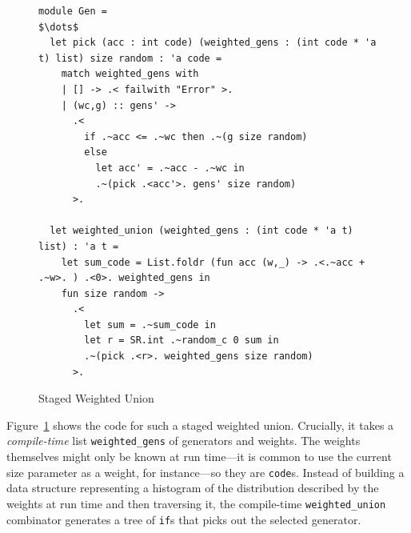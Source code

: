 \documentclass[acmsmall]{acmart}
\theoremstyle{definition}
\begin{document}

\begin{figure}[h]
\begin{lstlisting}
module Gen =
$\dots$
  let pick (acc : int code) (weighted_gens : (int code * 'a t) list) size random : 'a code =
    match weighted_gens with
    | [] -> .< failwith "Error" >.
    | (wc,g) :: gens' ->
      .<
        if .~acc <= .~wc then .~(g size random)
        else
          let acc' = .~acc - .~wc in
          .~(pick .<acc'>. gens' size random)
      >.

  let weighted_union (weighted_gens : (int code * 'a t) list) : 'a t =
    let sum_code = List.foldr (fun acc (w,_) -> .<.~acc + .~w>. ) .<0>. weighted_gens in
    fun size random ->
      .<
        let sum = .~sum_code in
        let r = SR.int .~random_c 0 sum in
        .~(pick .<r>. weighted_gens size random)
      >.
\end{lstlisting}
\caption{Staged Weighted Union}
\label{fig:staged-weighted-union}
\end{figure}

Figure~\ref{fig:staged-weighted-union} shows the code for such a staged weighted union.
Crucially, it takes a \emph{compile-time} list \texttt{weighted\_gens} of
generators and weights. The weights themselves might only be known at run time---it is
common to use the current size parameter as a weight, for instance---so they are \texttt{code}s.
Instead of building a data structure representing a histogram of the distribution described by the weights at run time and then traversing it,
the compile-time \texttt{weighted\_union} combinator generates a
tree of \texttt{if}s that picks out the selected generator.

\end{document}
